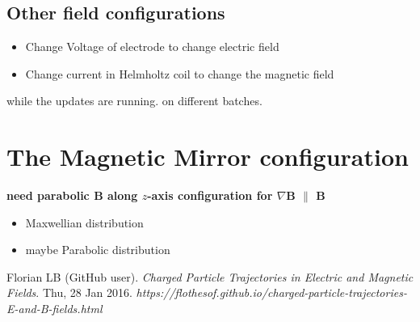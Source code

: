 \documentclass[12pt]{article}
\begin{document}
	\subsection{Other field configurations}
		\color{red}
	\begin{itemize}
		\item Change Voltage of electrode to change electric field
		\item Change current in Helmholtz coil to change the magnetic field 
	\end{itemize}
	while the updates are running.
	on different batches.
	\color{black}	\\ 
	
	\section{The Magnetic Mirror configuration}
	\color{red}
	\textbf{need parabolic $\mathbf{B}$ along $z$-axis configuration for $\nabla$$\mathbf{B}$ $\parallel$ $\mathbf{B}$ }
	
	\begin{itemize}
		\item Maxwellian distribution
		\item maybe Parabolic distribution
	\end{itemize}
	\color{black}
	
	\begin{thebibliography}{}
		 Florian LB (GitHub user). \textit{Charged Particle Trajectories in Electric and Magnetic Fields}. Thu, 28 Jan 2016. \textit{https://flothesof.github.io/charged-particle-trajectories-E-and-B-fields.html}
	\end{thebibliography}
\end{document}
